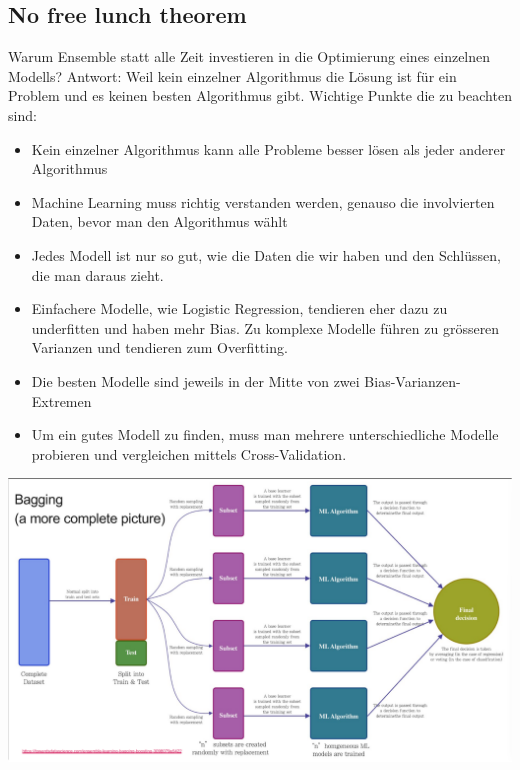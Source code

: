 \subsection{No free lunch theorem}
Warum Ensemble statt alle Zeit investieren in die Optimierung eines einzelnen Modells? Antwort: Weil kein einzelner Algorithmus die Lösung ist für ein Problem und es keinen besten Algorithmus gibt. Wichtige Punkte die zu beachten sind:
\begin{itemize}
\item Kein einzelner Algorithmus kann alle Probleme besser lösen als jeder anderer Algorithmus
\item Machine Learning muss richtig verstanden werden, genauso die involvierten Daten, bevor man den Algorithmus wählt
\item Jedes Modell ist nur so gut, wie die Daten die wir haben und den Schlüssen, die man daraus zieht.
\item Einfachere Modelle, wie Logistic Regression, tendieren eher dazu zu underfitten und haben mehr Bias. Zu komplexe Modelle führen zu grösseren Varianzen und tendieren zum Overfitting.
\item Die besten Modelle sind jeweils in der Mitte von zwei Bias-Varianzen-Extremen
\item Um ein gutes Modell zu finden, muss man mehrere unterschiedliche Modelle probieren und vergleichen mittels Cross-Validation.
\end{itemize}
\includegraphics[height=\linewidth, angle=90]{img/bagging_overview.png}
